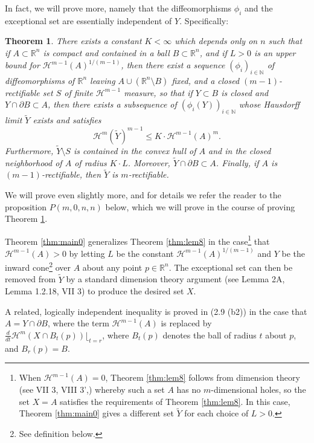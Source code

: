 \documentclass[10pt]{amsart}
\newtheorem{thm}{Theorem}
\theoremstyle{definition}
\theoremstyle{definition}
\theoremstyle{definition}
\theoremstyle{definition}
\theoremstyle{definition}
\theoremstyle{definition}
\theoremstyle{definition}
\newcommand{\R}{\ensuremath{\mathbb{R}}}
\newcommand{\N}{\ensuremath{\mathbb{N}}}
\newcommand{\<}{\langle}
\renewcommand{\>}{\rangle}
\def\i{\infty}
\def\fr{\partial}
\def\H{\mathcal{H}}
\begin{document}
In fact, we will prove more, namely that the diffeomorphisms \( \phi_i \) and the exceptional set are essentially independent of \( Y \). Specifically:

\begin{thm}
	\label{thm:main}
	There exists a constant \( K<\i \) which depends only on \( n \) such that if \( A\subset \R^n \) is compact and contained in a ball \( B\subset \R^n \), and if \( L>0 \) is an upper bound for \( \H^{m-1}(A)^{1/(m-1)} \), then there exist a sequence \( (\phi_i)_{i\in \N} \) of diffeomorphisms of \( \R^n \) leaving \( A\cup (\R^n\setminus B) \) fixed, and a closed \( (m-1) \)-rectifiable set \( S \) of finite \( \H^{m-1} \) measure, so that if \( Y\subset B \) is closed and \( Y\cap \fr B\subset A \), then there exists a subsequence of \( (\phi_i(Y))_{i\in \N} \) whose Hausdorff limit \( \tilde{Y} \) exists and satisfies \[ \H^m(\tilde{Y})^{m-1} \leq K\cdot \H^{m-1}(A)^m. \] Furthermore, \( \tilde{Y}\setminus S \) is contained in the convex hull of \( A \) and in the closed neighborhood of \( A \) of radius \( K\cdot L \). Moreover, \( \tilde{Y}\cap \fr B\subset A \). Finally, if \( A \) is \( (m-1) \)-rectifiable, then \( \tilde{Y} \) is \( m \)-rectifiable.
\end{thm}

We will prove even slightly more, and for details we refer the reader to the proposition \( P(m,0,n,n) \) below, which we will prove in the course of proving Theorem \ref{thm:main}.

Theorem \ref{thm:main0} generalizes Theorem \ref{thm:lem8} in the case\footnote{When \( \H^{m-1}(A)=0 \), Theorem \ref{thm:lem8} follows from dimension theory (see \cite{hurewicz} VII 3, VIII 3',) whereby such a set \( A \) has no \( m \)-dimensional holes, so the set \( X=A \) satisfies the requirements of Theorem \ref{thm:lem8}. In this case, Theorem \ref{thm:main0} gives a different set \( \tilde{Y} \) for each choice of \( L>0 \).} that \( \H^{m-1}(A)>0 \) by letting \( L \) be the constant \( \H^{m-1}(A)^{1/(m-1)} \) and \( Y \) be the inward cone\footnote{See definition below.} over \( A \) about any point \( p\in \R^n \). The exceptional set can then be removed from \( \tilde{Y} \) by a standard dimension theory argument (see \cite{reifenberg} Lemma 2A, \cite{cohomology} Lemma 1.2.18, \cite{hurewicz} VII 3) to produce the desired set \( X \).

A related, logically independent inequality is proved in \cite{almgrenannals} (2.9 (b2)) in the case that \( A=Y\cap \fr B \), where the term \( \H^{m-1}(A) \) is replaced by \( \frac{d}{dt} \H^m(X\cap B_t(p))\lfloor_{t=r} \), where \( B_t(p) \) denotes the ball of radius \( t \) about \( p \), and \( B_r(p)=B \).
\end{document}
